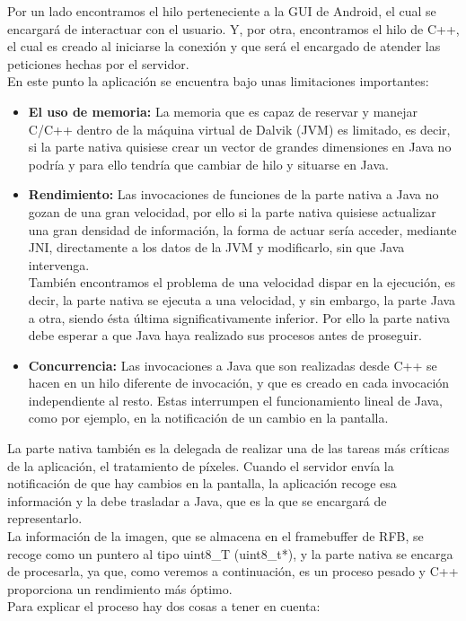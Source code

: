 Por un lado encontramos el hilo perteneciente a la GUI de Android, el cual se encargará de interactuar con el usuario. Y, por otra, encontramos el hilo de C++, el cual es creado al iniciarse la conexión y que será el encargado de atender las peticiones hechas por el servidor.\\

En este punto la aplicación se encuentra bajo unas limitaciones importantes:
\begin{itemize}
\item \textbf{El uso de memoria:} La memoria que es capaz de reservar y manejar C/C++ dentro de la máquina virtual de Dalvik (JVM) es limitado, es decir, si la parte nativa quisiese crear un vector de grandes dimensiones en Java no podría y para ello tendría que cambiar de hilo y situarse en Java.
\item \textbf{Rendimiento:} Las invocaciones de funciones de la parte nativa a Java no gozan de una gran velocidad, por ello si la parte nativa quisiese actualizar una gran densidad de información, la forma de actuar sería acceder, mediante JNI, directamente a los datos de la JVM y modificarlo, sin que Java intervenga.\\

También encontramos el problema de una velocidad dispar en la ejecución, es decir, la parte nativa se ejecuta a una velocidad, y sin embargo, la parte Java a otra, siendo ésta última significativamente inferior. Por ello la parte nativa debe esperar a que Java haya realizado sus procesos antes de proseguir.

\item \textbf{Concurrencia:} Las invocaciones a Java que son realizadas desde C++ se hacen en un hilo diferente de invocación, y que es creado en cada invocación independiente al resto. Estas interrumpen el funcionamiento lineal de Java, como por ejemplo, en la notificación de un cambio en la pantalla.

\end{itemize}

La parte nativa también es la delegada de realizar una de las tareas más críticas de la aplicación, el tratamiento de píxeles. Cuando el servidor envía la notificación de que hay cambios en la pantalla, la aplicación recoge esa información y la debe trasladar a Java, que es la que se encargará de representarlo.\\

La información de la imagen, que se almacena en el framebuffer de RFB, se recoge como un puntero al tipo uint8\_T (uint8\_t*), y la parte nativa se encarga de procesarla, ya que, como veremos a continuación, es un proceso pesado y C++ proporciona un rendimiento más óptimo.\\
Para explicar el proceso hay dos cosas a tener en cuenta:\\

